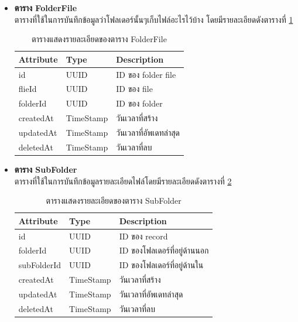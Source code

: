 \documentclass[12pt,oneside,openright,a4paper]{cpe-thai-project}
\begin{document}
\begin{itemize}
\item \textbf{ตาราง FolderFile}\\
ตารางที่ใช้ในการบันทึกข้อมูลว่าโฟลเดอร์นั้นๆเก็บไฟล์อะไรไว้บ้าง โดยมีรายละเอียดดังตารางที่  \ref{tbl:dbFolderFile}
\begin{table}[!ht]
    \centering
    \begin{tabular}{|p{4cm}|p{2cm}|p{6cm}|}
    \hline
    \textbf{Attribute} & \textbf{Type} & \textbf{Description}   \\ \hline
    id        & UUID      & ID ของ folder file     \\ \hline
    flieId    & UUID      & ID ของ file            \\ \hline
    folderId  & UUID      & ID ของ folder          \\ \hline
    createdAt & TimeStamp & วันเวลาที่สร้าง        \\ \hline
    updatedAt & TimeStamp & วันเวลาที่อัพเดทล่าสุด \\ \hline
    deletedAt & TimeStamp & วันเวลาที่ลบ              \\ \hline
    \end{tabular}
    \caption{\centering  ตารางแสดงรายละเอียดของตาราง FolderFile} \label{tbl:dbFolderFile}
\end{table}
\newpage
\item \textbf{ตาราง SubFolder}\\
ตารางที่ใช้ในการบันทึกข้อมูลรายละเอียดไฟล์โดยมีรายละเอียดดังตารางที่ \ref{tbl:dbSubFolder}
\begin{table}[!ht]
    \centering
    \begin{tabular}{|p{4cm}|p{2cm}|p{6cm}|}
    \hline
    \textbf{Attribute} & \textbf{Type} & \textbf{Description}   \\ \hline
    id          & UUID      & ID ของ record                \\ \hline
    folderId    & UUID      & ID ของโฟลเดอร์ที่อยู่ด้านนอก \\ \hline
    subFolderId & UUID      & ID ของโฟลเดอร์ที่อยู่ด้านใน  \\ \hline
    createdAt   & TimeStamp & วันเวลาที่สร้าง              \\ \hline
    updatedAt   & TimeStamp & วันเวลาที่อัพเดทล่าสุด       \\ \hline
    deletedAt   & TimeStamp & วันเวลาที่ลบ                \\ \hline  
    \end{tabular}
    \caption{\centering  ตารางแสดงรายละเอียดของตาราง SubFolder} \label{tbl:dbSubFolder}
\end{table}


\end{itemize}
\end{document}
